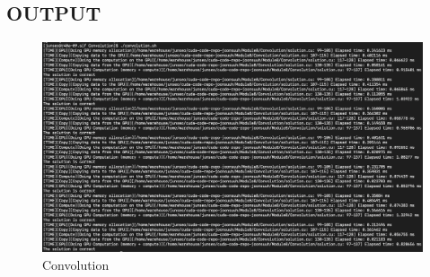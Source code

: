 \documentclass[../main.tex]{subfiles}
\begin{document}
\newpage
\subsection*{OUTPUT}
\begin{figure}[ht]
    \centering
    \includegraphics[width=\textwidth]{convolution.png}
    \caption{Convolution}
    \label{fig:convolution}
\end{figure}
\end{document}
